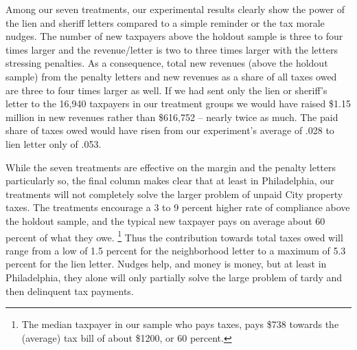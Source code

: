 Among our seven treatments, our experimental results clearly show the
power of the lien and sheriff letters compared to a simple reminder or
the tax morale nudges.  The number of new taxpayers above the holdout
sample is three to four times larger and the revenue/letter is two to
three times larger with the letters stressing penalties.  As a
consequence, total new revenues (above the holdout sample) from the
penalty letters and new revenues as a share of all taxes owed are
three to four times larger as well.  If we had sent only the lien or
sheriff's letter to the 16,940 taxpayers in our treatment groups we
would have raised \$1.15 million in new revenues rather than \$616,752
-- nearly twice as much.  The paid share of taxes owed would have
risen from our experiment's average of .028 to lien letter only of
.053.

While the seven treatments are effective on the margin and the penalty
letters particularly so, the final column makes clear that at least in
Philadelphia, our treatments will not completely solve the larger
problem of unpaid City property taxes.  The treatments encourage a 3
to 9 percent higher rate of compliance above the holdout sample, and
the typical new taxpayer pays on average about 60 percent of what they
owe. \footnote{The median taxpayer in our sample who pays taxes,
  pays \$738 towards the (average) tax bill of about \$1200, or 60
  percent.}  Thus the contribution towards total taxes owed will range
from a low of 1.5 percent for the neighborhood letter to a maximum of
5.3 percent for the lien letter.  Nudges help, and money is money, but
at least in Philadelphia, they alone will only partially solve the large problem
of tardy and then delinquent tax payments.

